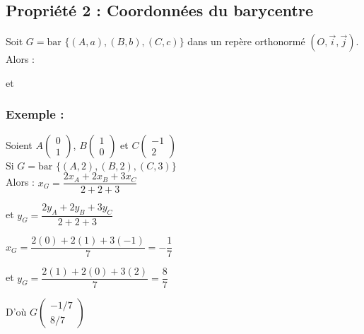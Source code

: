 \documentclass{article}
\begin{document}
\subsection*{Propriété 2 : Coordonnées du barycentre}

\noindent Soit $G = \text{bar } \{(A, a), (B, b), (C, c)\}$ dans un repère orthonormé $(O, \vec{i}, \vec{j})$. Alors :

\vspace{1.5em}

\begin{center}
    \color{red}
    \quad et \quad 
\end{center}

\subsubsection*{Exemple :}

\noindent Soient $A \begin{pmatrix} 0 \\ 1 \end{pmatrix}$, $B \begin{pmatrix} 1 \\ 0 \end{pmatrix}$ et $C \begin{pmatrix} -1 \\ 2 \end{pmatrix}$ \\
Si $G = \text{bar } \{(A, 2), (B, 2), (C, 3)\}$ \\
Alors : $x_G = \dfrac{2x_A + 2x_B + 3x_C}{2 + 2 + 3}$ 

\vspace{1em}

\noindent et $y_G = \dfrac{2y_A + 2y_B + 3y_C}{2 + 2 + 3}$

\vspace{1.5em}

\noindent $x_G = \dfrac{2(0) + 2(1) + 3(-1)}{7} = -\dfrac{1}{7}$

\vspace{1.5em}

\noindent et $y_G = \dfrac{2(1) + 2(0) + 3(2)}{7} = \dfrac{8}{7}$

\vspace{1.5em}

\noindent D'où $G \begin{pmatrix} -1/7 \\ 8/7 \end{pmatrix}$
\end{document}
